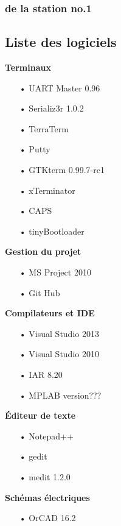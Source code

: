 \documentclass[10pt,a4paper,final]{article}
\begin{document}
\begin{spacing}{1.5}
\vfill
\pagebreak

\subsubsection{de la station no.1}

\subsection{Liste des logiciels}
\begin{flushleft}
\HRule
\end{flushleft}
\begin{flushleft}

\begin{multicols}{3}

\textbf{Terminaux}
\begin{itemize}
\item[•]UART Master 0.96
\item[•]Serializ3r 1.0.2
\item[•]TerraTerm
\item[•]Putty
\item[•]GTKterm 0.99.7-rc1
\item[•]xTerminator
\item[•]CAPS
\item[•]tinyBootloader
\end{itemize}

\textbf{Gestion du projet}
\begin{itemize}
\item[•]MS Project 2010
\item[•]Git Hub
\end{itemize}

\textbf{Compilateurs et IDE}
\begin{itemize}
\item[•]Visual Studio 2013
\item[•]Visual Studio 2010
\item[•]IAR 8.20
\item[•]MPLAB version???
\end{itemize}

\textbf{Éditeur de texte}
\begin{itemize}
\item[•]Notepad++
\item[•]gedit
\item[•]medit 1.2.0
\end{itemize}
\textbf{Schémas électriques}

\begin{itemize}
\item[•]OrCAD 16.2
\end{itemize}


\end{multicols}
\end{flushleft}
\end{spacing}
\end{document}

